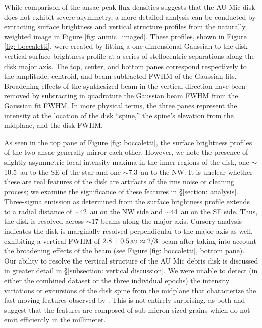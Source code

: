 \documentclass[modern]{aastex62}
\begin{document}
While comparison of the ansae peak flux densities suggests that the AU Mic disk does not exhibit severe asymmetry, a more detailed analysis can be conducted by extracting surface brightness and vertical structure profiles from the naturally weighted image in Figure \ref{fig: aumic_imaged}.
These profiles, shown in Figure \ref{fig: boccaletti}, were created by fitting a one-dimensional Gaussian to the disk vertical surface brightness profile at a series of stellocentric separations along the disk major axis.
The top, center, and bottom panes correspond respectively to the amplitude, centroid, and beam-subtracted FWHM of the Gaussian fits. 
Broadening effects of the synthesized beam in the vertical direction have been removed by subtracting in quadrature the Gaussian beam FWHM from the Gaussian fit FWHM.
In more physical terms, the three panes represent the intensity at the location of the disk ``spine,'' the spine's elevation from the midplane, and the disk FWHM.

As seen in the top pane of Figure \ref{fig: boccaletti}, the surface brightness profiles of the two ansae generally mirror each other.
However, we note the presence of slightly asymmetric local intensity maxima in the inner regions of the disk, one $\sim$\SI{10.5}{au} to the SE of the star and one $\sim$\SI{7.3}{au} to the NW. 
It is unclear whether these are real features of the disk are artifacts of the rms noise or cleaning process; we examine the significance of these features in \S \ref{section: analysis}.
Three-sigma emission as determined from the surface brightness profile extends to a radial distance of $\sim$\SI{42}{au} on the NW side and $\sim$\SI{44}{au} on the SE side. 
Thus, the disk is resolved across $\sim$17 beams along the major axis. 
Cursory analysis indicates the disk is marginally resolved perpendicular to the major axis as well, exhibiting a vertical FWHM of $\SI{2.8 \pm 0.5}{au} \approx 2/3$ beam after taking into account the broadening effects of the beam (see Figure \ref{fig: boccaletti}, bottom pane).
Our ability to resolve the vertical structure of the AU Mic debris disk is discussed in greater detail in \S \ref{subsection: vertical discussion}.
We were unable to detect (in either the combined dataset or the three individual epochs) the intensity variations or excursions of the disk spine from the midplane that characterize the fast-moving features observed by \cite{boccaletti15,boccaletti18}.
This is not entirely surprising, as both \cite{sezestre17} and \cite{chiang&fung17} suggest that the features are composed of sub-micron-sized grains which do not emit efficiently in the millimeter.
\end{document}
